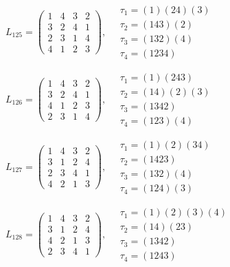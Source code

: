 $L_{125} = \begin{pmatrix} 1 & 4 & 3 & 2 \\ 3 & 2 & 4 & 1 \\ 2 & 3 & 1 & 4 \\ 4 & 1 & 2 & 3 \end{pmatrix}, \quad \begin{matrix} \tau_{1} = (1)(2 4)(3) \\ \tau_{2} = (1 4 3)(2) \\ \tau_{3} = (1 3 2)(4) \\ \tau_{4} = (1 2 3 4) \end{matrix}$

$L_{126} = \begin{pmatrix} 1 & 4 & 3 & 2 \\ 3 & 2 & 4 & 1 \\ 4 & 1 & 2 & 3 \\ 2 & 3 & 1 & 4 \end{pmatrix}, \quad \begin{matrix} \tau_{1} = (1)(2 4 3) \\ \tau_{2} = (1 4)(2)(3) \\ \tau_{3} = (1 3 4 2) \\ \tau_{4} = (1 2 3)(4) \end{matrix}$

$L_{127} = \begin{pmatrix} 1 & 4 & 3 & 2 \\ 3 & 1 & 2 & 4 \\ 2 & 3 & 4 & 1 \\ 4 & 2 & 1 & 3 \end{pmatrix}, \quad \begin{matrix} \tau_{1} = (1)(2)(3 4) \\ \tau_{2} = (1 4 2 3) \\ \tau_{3} = (1 3 2)(4) \\ \tau_{4} = (1 2 4)(3) \end{matrix}$

$L_{128} = \begin{pmatrix} 1 & 4 & 3 & 2 \\ 3 & 1 & 2 & 4 \\ 4 & 2 & 1 & 3 \\ 2 & 3 & 4 & 1 \end{pmatrix}, \quad \begin{matrix} \tau_{1} = (1)(2)(3)(4) \\ \tau_{2} = (1 4)(2 3) \\ \tau_{3} = (1 3 4 2) \\ \tau_{4} = (1 2 4 3) \end{matrix}$

